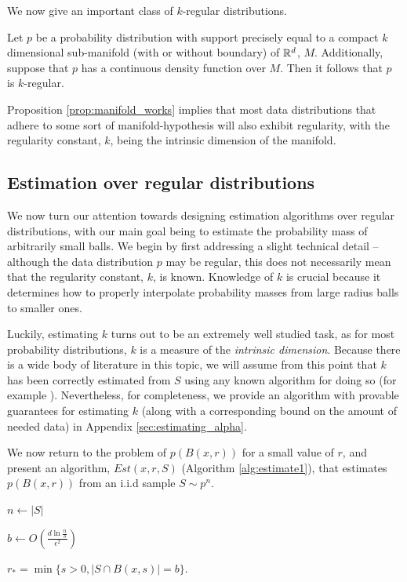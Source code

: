 We now give an important class of $k$-regular distributions.

\begin{proposition}\label{prop:manifold_works}
Let $p$ be a probability distribution with support precisely equal to a compact $k$ dimensional sub-manifold (with or without boundary) of $\mathbb{R}^d$, $M$. Additionally, suppose that $p$ has a continuous density function over $M$. Then it follows that $p$ is $k$-regular.
\end{proposition}

Proposition \ref{prop:manifold_works} implies that most data distributions that adhere to some sort of manifold-hypothesis will also exhibit regularity, with the regularity constant, $k$, being the intrinsic dimension of the manifold.

\subsection{Estimation over regular distributions}

We now turn our attention towards designing estimation algorithms over regular distributions, with our main goal being to estimate the probability mass of arbitrarily small balls. We begin by first addressing a slight technical detail -- although the data distribution $p$ may be regular, this does not necessarily mean that the regularity constant, $k$, is known. Knowledge of $k$ is crucial because it determines how to properly interpolate probability masses from large radius balls to smaller ones. 

Luckily, estimating $k$ turns out to be an extremely well studied task, as for most probability distributions, $k$ is a measure of the \textit{intrinsic dimension}. Because there is a wide body of literature in this topic, we will assume from this point that $k$ has been correctly estimated from $S$ using any known algorithm for doing so (for example \cite{BJPR22}). Nevertheless, for completeness, we provide an algorithm with provable guarantees for estimating $k$ (along with a corresponding bound on the amount of needed data) in Appendix \ref{sec:estimating_alpha}.

We now return to the problem of $p(B(x, r))$ for a small value of $r$, and present an algorithm, $Est(x, r, S)$ (Algorithm \ref{alg:estimate1}), that estimates $p(B(x, r))$ from an i.i.d sample $S \sim p^n$.

\begin{algorithm}
   \caption{$Est(x, r, S)$}
   \label{alg:estimate1}

   \DontPrintSemicolon
   
	$n \leftarrow |S|$\;
	
   $b \leftarrow O\left(\frac{d \ln \frac{n}{\delta}}{\epsilon^2} \right)$\;
   
   $r_* = \min \{s > 0, |S \cap B(x, s)| = b\}$.\;
   

\end{algorithm}

